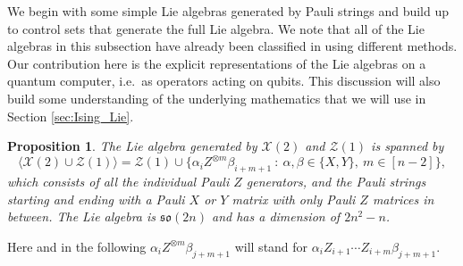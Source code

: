 \documentclass[12pt, a4-paper]{amsart}
\newcommand{\cX}{\mathcal{X}}
\newcommand{\cZ}{\mathcal{Z}}
\newcommand{\mf}[1]{\mathfrak{#1}}
\numberwithin{equation}{section}
\newcommand{\ten}{\otimes}
\newcommand{\al}{\alpha}
\newtheorem{proposition}[lemma]{Proposition}
\begin{document}
We begin with some simple Lie algebras generated by Pauli strings and build up to control sets that generate the full Lie algebra. We note that all of the Lie algebras in this subsection have already been classified in \cite{Aguilar2024FullClassificationLie} using different methods. Our contribution here is the explicit representations of the Lie algebras on a quantum computer, i.e.\ as operators acting on qubits. This discussion will also build some understanding of the underlying mathematics that we will use in Section \ref{sec:Ising_Lie}.

\begin{proposition}\label{prop:single-double}
    The Lie algebra generated by $\cX(2)$ and $\cZ(1)$ is spanned by
    \begin{equation}
        \langle \cX(2) \cup \cZ(1) \rangle = \cZ(1) \cup \{\alpha_i Z^{\otimes m} \beta_{i+m+1} ~:~ \alpha, \beta \in \{X,Y\},~ m \in [n-2] \},
    \end{equation}
    which consists of all the individual Pauli $Z$ generators, and the Pauli strings starting and ending with a Pauli $X$ or $Y$ matrix with only Pauli $Z$ matrices in between. The Lie algebra is $\mf{so}(2n)$ and has a dimension of $2n^2-n$.
\end{proposition}
Here and in the following $\al_iZ^{\ten m}\beta_{j+m+1}$ will stand for $\al_iZ_{i+1}\cdots Z_{i+m}\beta_{j+m+1}$. 
\end{document}
